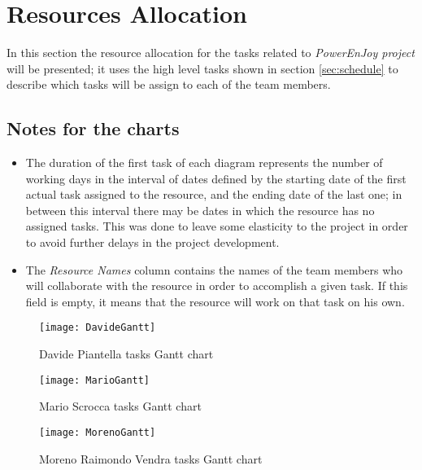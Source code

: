 \section{Resources Allocation}\label{sec:resAlloc}
In this section the resource allocation for the tasks related to \emph{PowerEnJoy project} will be presented; it uses the high level tasks shown in section \ref{sec:schedule} to describe which tasks will be assign to each of the team members.

\subsection{Notes for the charts}
\begin{itemize}
	\item The duration of the first task of each diagram represents the number of working days in the interval of dates defined by the starting date of the first actual task assigned to the resource, and the ending date of the last one; in between this interval there may be dates in which the resource has no assigned tasks. This was done to leave some elasticity to the project in order to avoid further delays in the project development.
	\item The \emph{Resource Names} column contains the names of the team members who will collaborate with the resource in order to accomplish a given task. If this field is empty, it means that the resource will work on that task on his own.
\end{itemize}

\begin{figure}[h]
	\centering
	\texttt{[image: DavideGantt]}	\caption{
		\label{fig:davideGantt} 
		Davide Piantella tasks Gantt chart
	}
	
\end{figure}\begin{figure}[h]
	\centering
	\texttt{[image: MarioGantt]}	\caption{
		\label{fig:marioGantt} 
		Mario Scrocca tasks Gantt chart
	}
	
\end{figure}\begin{figure}[h]
	\centering
	\texttt{[image: MorenoGantt]}	\caption{
		\label{fig:morenoGantt} 
		Moreno Raimondo Vendra tasks Gantt chart
	}
\end{figure}